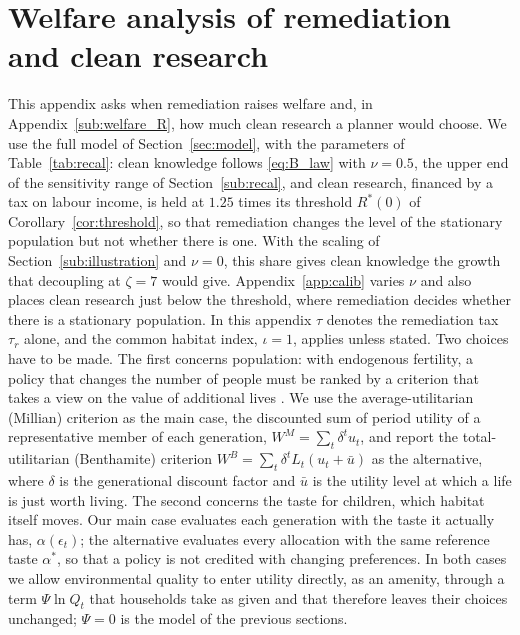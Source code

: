 \documentclass[11pt]{article}
\begin{document}
\section{Welfare analysis of remediation and clean research}
\label{sub:welfare}
\setcounter{table}{0}
This appendix asks when remediation raises welfare and, in Appendix~\ref{sub:welfare_R}, how much
clean research a planner would choose. We use the full model of
Section~\ref{sec:model}, with the parameters of Table~\ref{tab:recal}: clean knowledge follows
\eqref{eq:B_law} with $\nu=0.5$, the upper end of the sensitivity range of Section~\ref{sub:recal}, and clean research, financed by a tax on labour
income, is held at $1.25$ times its threshold $R^\ast(0)$ of Corollary~\ref{cor:threshold}, so that
remediation changes the level of the stationary population but not whether there is one. With the scaling
of Section~\ref{sub:illustration} and $\nu=0$, this share gives clean knowledge the growth that decoupling
at $\zeta=7$ would give. Appendix~\ref{app:calib} varies $\nu$ and also places clean research just below
the threshold, where remediation decides whether there is a stationary population. In this appendix
$\tau$ denotes the remediation tax $\tau_r$ alone, and the common habitat index, $\iota=1$, applies unless
stated. Two choices have to be made. The first concerns population: with endogenous fertility, a
policy that changes the number of people must be ranked by a criterion that takes a view on the value of
additional lives \citep{golosov2007}. We use the average-utilitarian (Millian) criterion as the main
case, the discounted sum of period utility of a representative member of each generation,
$W^{M}=\sum_t\delta^tu_t$, and report the total-utilitarian (Benthamite) criterion
$W^{B}=\sum_t\delta^tL_t(u_t+\bar u)$ as the alternative, where $\delta$ is the generational discount
factor and $\bar u$ is the utility level at which a life is just worth living. The second concerns the taste for children, which habitat itself moves. Our
main case evaluates each generation with the taste it actually has, $\alpha(\epsilon_t)$; the
alternative evaluates every allocation with the same reference taste $\alpha^\ast$, so that a policy is
not credited with changing preferences. In both cases we allow environmental quality to enter utility
directly, as an amenity, through a term $\Psi\ln Q_t$ that households take as given and that therefore
leaves their choices unchanged; $\Psi=0$ is the model of the previous sections.
\end{document}
